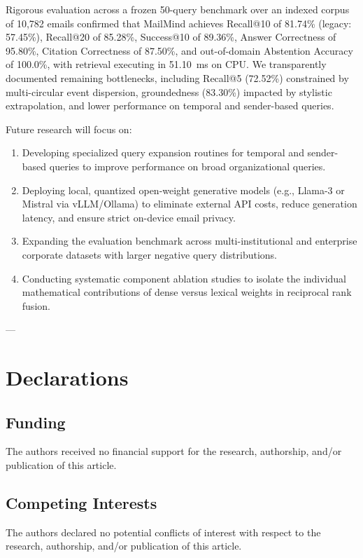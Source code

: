 \documentclass[11pt,a4paper]{article}
\begin{document}
Rigorous evaluation across a frozen 50-query benchmark over an indexed corpus of 10,782 emails confirmed that MailMind achieves Recall@10 of 81.74\% (legacy: 57.45\%), Recall@20 of 85.28\%, Success@10 of 89.36\%, Answer Correctness of 95.80\%, Citation Correctness of 87.50\%, and out-of-domain Abstention Accuracy of 100.0\%, with retrieval executing in 51.10~ms on CPU. We transparently documented remaining bottlenecks, including Recall@5 (72.52\%) constrained by multi-circular event dispersion, groundedness (83.30\%) impacted by stylistic extrapolation, and lower performance on temporal and sender-based queries.

Future research will focus on:
\begin{enumerate}
    \item Developing specialized query expansion routines for temporal and sender-based queries to improve performance on broad organizational queries.
    \item Deploying local, quantized open-weight generative models (e.g., Llama-3 or Mistral via vLLM/Ollama) to eliminate external API costs, reduce generation latency, and ensure strict on-device email privacy.
    \item Expanding the evaluation benchmark across multi-institutional and enterprise corporate datasets with larger negative query distributions.
    \item Conducting systematic component ablation studies to isolate the individual mathematical contributions of dense versus lexical weights in reciprocal rank fusion.
\end{enumerate}

---

\section*{Declarations}

\subsection*{Funding}
The authors received no financial support for the research, authorship, and/or publication of this article.

\subsection*{Competing Interests}
The authors declared no potential conflicts of interest with respect to the research, authorship, and/or publication of this article.
\end{document}
